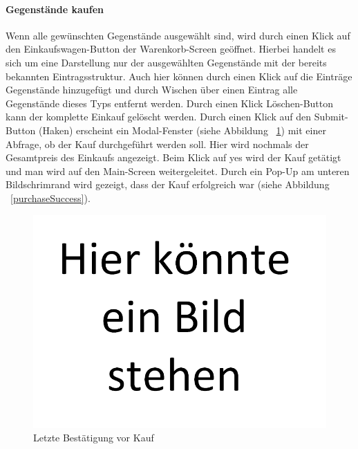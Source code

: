 \documentclass{scrartcl}
\begin{document}
		\paragraph*{Gegenstände kaufen}
		Wenn alle gewünschten Gegenstände ausgewählt sind, wird durch einen Klick auf den Einkaufswagen-Button der Warenkorb-Screen geöffnet. Hierbei handelt es sich um eine Darstellung nur der ausgewählten Gegenstände mit der bereits bekannten Eintragsstruktur. Auch hier können durch einen Klick auf die Einträge Gegenstände hinzugefügt und durch Wischen über einen Eintrag alle Gegenstände dieses Typs entfernt werden. Durch einen Klick Löschen-Button kann der komplette Einkauf gelöscht werden. Durch einen Klick auf den Submit-Button (Haken) erscheint ein Modal-Fenster (siehe Abbildung ~\ref{shoppingCartCheck}) mit einer Abfrage, ob der Kauf durchgeführt werden soll. Hier wird nochmals der Gesamtpreis des Einkaufs angezeigt. Beim Klick auf \glqq yes\grqq{} wird der Kauf getätigt und man wird auf den Main-Screen weitergeleitet. Durch ein Pop-Up am unteren Bildschrimrand wird gezeigt, dass der Kauf erfolgreich war (siehe Abbildung ~\ref{purchaseSuccess}).
		
		\begin{figure}[!h]
			\centering
			\includegraphics[scale=0.5]{./figures/placeholder.png}
			\caption{Letzte Bestätigung vor Kauf}
			\label{shoppingCartCheck}
		\end{figure}
		
\end{document}

